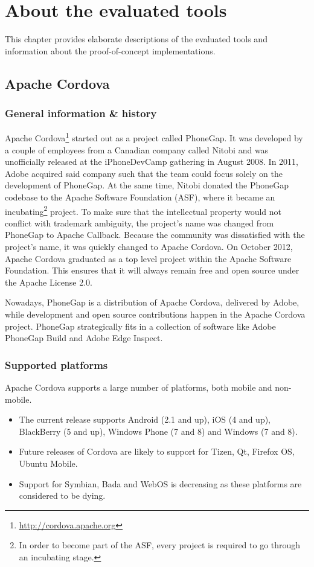 \chapter{About the evaluated tools}
\label{chap:tools}

This chapter provides elaborate descriptions of the evaluated tools and information about the proof-of-concept implementations. 

\section{Apache Cordova}

\subsection{General information \& history}

Apache Cordova\footnote{\url{http://cordova.apache.org}} started out as a project called PhoneGap. It was developed by a couple of employees from a Canadian company called Nitobi and was unofficially released at the iPhoneDevCamp gathering in August 2008. In 2011, Adobe acquired said company such that the team could focus solely on the development of PhoneGap. At the same time, Nitobi donated the PhoneGap codebase to the Apache Software Foundation (ASF), where it became an incubating\footnote{In order to become part of the ASF, every project is required to go through an incubating stage.} project. To make sure that the intellectual property would not conflict with trademark ambiguity, the project's name was changed from PhoneGap to Apache Callback. Because the community was dissatisfied with the project's name, it was quickly changed to Apache Cordova. On October 2012, Apache Cordova graduated as a top level project within the Apache Software Foundation. This ensures that it will always remain free and open source under the Apache License 2.0.

Nowadays, PhoneGap is a distribution of Apache Cordova, delivered by Adobe, while development and open source contributions happen in the Apache Cordova project. PhoneGap strategically fits in a collection of software like Adobe PhoneGap Build and Adobe Edge Inspect. 

\subsection{Supported platforms}
\label{sec:ac:support}

Apache Cordova supports a large number of platforms, both mobile and non-mobile.
\begin{itemize}
    \item The current release supports Android (2.1 and up), iOS (4 and up), BlackBerry (5 and up), Windows Phone (7 and 8) and Windows (7 and 8). 
    \item Future releases of Cordova are likely to support for Tizen, Qt, Firefox OS, Ubuntu Mobile.
    \item Support for Symbian, Bada and WebOS is decreasing as these platforms are considered to be dying. 
\end{itemize}

